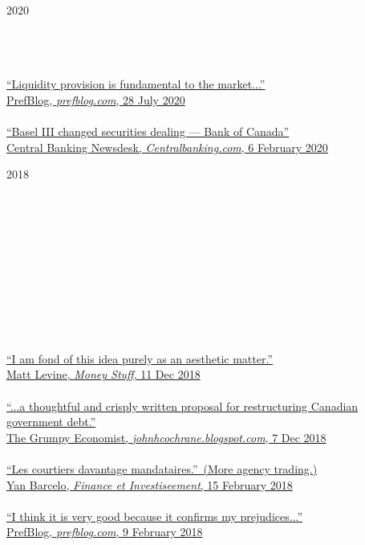\documentclass[11pt,letterpaper]{article}
\begin{document}
\noindent
\begin{minipage}[ht]{0.15\textwidth}
2020 \\
\\
\\
\\
\end{minipage}
\begin{minipage}[ht]{0.80\textwidth}
\href{http://prefblog.com/?p=41178}{``Liquidity provision is fundamental to the market...'' \\
PrefBlog, \textit{prefblog.com}, 28 July 2020} \\
\\
\href{https://www.centralbanking.com/central-banks/financial-stability/4703391/basell-iii-changed-securities-dealing-bank-of-canada-paper}{``Basel III changed securities dealing --- Bank of Canada'' \\
Central Banking Newsdesk, \textit{Centralbanking.com}, 6 February 2020}
\end{minipage}

\bigskip

\noindent
\begin{minipage}[ht]{0.15\textwidth}
2018 \\
\\
\\
\\
\\
\\
\\
\\
\\
\\
\\
\end{minipage}
\begin{minipage}[ht]{0.80\textwidth}
\href{https://www.bloomberg.com/opinion/articles/2018-12-11/a-happy-anniversary-for-madoff-s-scam}{``I am fond of this idea purely as an aesthetic matter.'' \\
Matt Levine, \textit{Money Stuff}, 11 Dec 2018} \\
\\
\href{https://johnhcochrane.blogspot.com/2018/12/canadian-debt.html}{``...a thoughtful and crisply written proposal for restructuring Canadian government debt.'' \\
The Grumpy Economist, \textit{johnhcochrane.blogspot.com}, 7 Dec 2018} \\
\\
\href{https://www.finance-investissement.com/edition-papier/economie-et-recherche-edition-papier/les-courtiers-davantage-mandataires/}{``Les courtiers davantage mandataires.''~(More agency trading.) \\
Yan Barcelo, \textit{Finance et Investiseement}, 15 February 2018} \\
\\
\href{http://prefblog.com/?p-2582&paged=75}{``I think it is very good because it confirms my prejudices...'' \\
PrefBlog, \textit{prefblog.com}, 9 February 2018}
\end{minipage}
\end{document}
